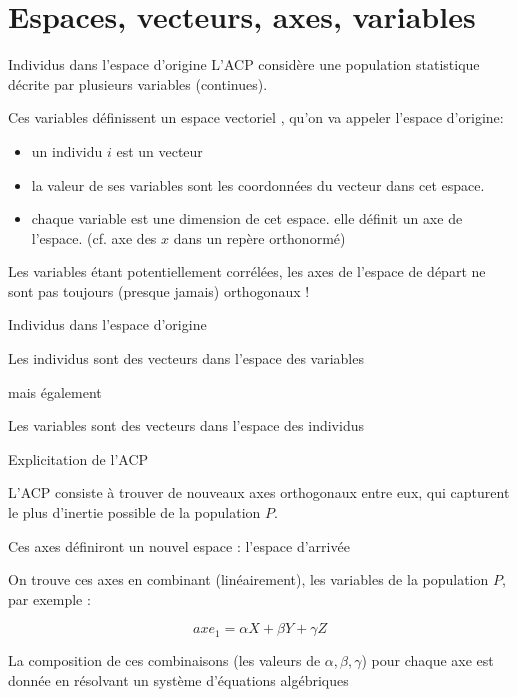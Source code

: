 \documentclass{beamer}
\begin{document}
\section{Espaces, vecteurs, axes, variables}


\begin{frame}{Individus dans l'espace d'origine}
L'ACP considère une population statistique décrite par plusieurs variables (continues).


Ces variables définissent un \alert{espace vectoriel} , qu'on va appeler l'espace d'\alert{origine}: 
\begin{itemize}
	\item un individu $i$ est un \alert{vecteur}
	\item la valeur de ses variables sont les \alert{coordonnées} du vecteur dans cet espace. 
	\item chaque variable est une \alert{dimension} de cet espace. elle définit un \alert{axe} de l'espace. (cf. axe des $x$ dans un repère orthonormé)
\end{itemize}

Les variables étant potentiellement \alert{corrélées}, les axes de l'espace de départ ne sont pas toujours (presque jamais) orthogonaux ! 


\end{frame}


\begin{frame}{Individus dans l'espace d'origine}

Les individus sont des vecteurs dans l'espace des variables 


\medskip mais également \medskip

Les variables sont des vecteurs dans l'espace des individus 


\end{frame}





\begin{frame}{Explicitation de l'ACP}


L'ACP consiste à trouver de  \alert{nouveaux axes orthogonaux entre eux}, qui capturent le \alert{plus d'inertie possible} de la population $P$.


Ces axes définiront un nouvel espace : l'\alert{espace d'arrivée}


On trouve ces axes en combinant (linéairement), les variables de la population $P$, par exemple :

$$ axe_1 = \alpha X + \beta Y + \gamma Z $$ 

La composition de ces combinaisons (les valeurs de $\alpha, \beta, \gamma$) pour chaque axe est donnée en résolvant un système d'équations algébriques 
\end{frame}
\end{document}
